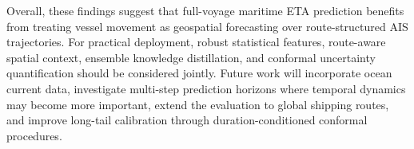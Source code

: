 \documentclass[sigconf,anonymous]{acmart}%
\begin{document}
Overall, these findings suggest that full-voyage maritime ETA prediction benefits from treating vessel movement as geospatial forecasting over route-structured AIS trajectories. For practical deployment, robust statistical features, route-aware spatial context, ensemble knowledge distillation, and conformal uncertainty quantification should be considered jointly. Future work will incorporate ocean current data, investigate multi-step prediction horizons where temporal dynamics may become more important, extend the evaluation to global shipping routes, and improve long-tail calibration through duration-conditioned conformal procedures.




\end{document}
